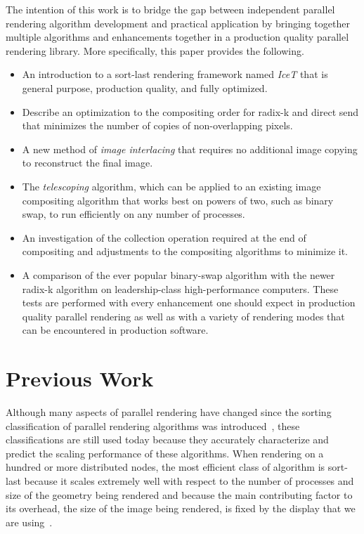 \documentclass{vgtc}                          %
\newcommand*{\lcite}[1]{~\cite{#1}}
\newcommand*{\keyterm}[1]{\emph{#1}}
\begin{document}
The intention of this work is to bridge the gap between independent
parallel rendering algorithm development and practical application by
bringing together multiple algorithms and enhancements together in a
production quality parallel rendering library.  More specifically, this
paper provides the following.

\begin{itemize}
\item An introduction to a sort-last rendering framework named
  \keyterm{IceT} that is general purpose, production quality, and fully
  optimized.
\item Describe an optimization to the compositing order for radix-k and
  direct send that minimizes the number of copies of non-overlapping
  pixels.
\item A new method of \keyterm{image interlacing} that requires no
  additional image copying to reconstruct the final image.
\item The \keyterm{telescoping} algorithm, which can be applied to an
  existing image compositing algorithm that works best on powers of two,
  such as binary swap, to run efficiently on any number of processes.
\item An investigation of the collection operation required at the end of
  compositing and adjustments to the compositing algorithms to minimize
  it.
\item A comparison of the ever popular binary-swap algorithm with the newer
  radix-k algorithm on leadership-class high-performance computers.  These
  tests are performed with every enhancement one should expect in
  production quality parallel rendering as well as with a variety of
  rendering modes that can be encountered in production software.
\end{itemize}

\section{Previous Work}
\label{sec:PreviousWork}

Although many aspects of parallel rendering have changed since the sorting
classification of parallel rendering algorithms was
introduced\lcite{Molnar1994}, these classifications are still used today
because they accurately characterize and predict the scaling performance of
these algorithms.  When rendering on a hundred or more distributed nodes,
the most efficient class of algorithm is sort-last because it scales
extremely well with respect to the number of processes and size of the
geometry being rendered and because the main contributing factor to its
overhead, the size of the image being rendered, is fixed by the display
that we are using\lcite{Wylie2001}.
\end{document}

